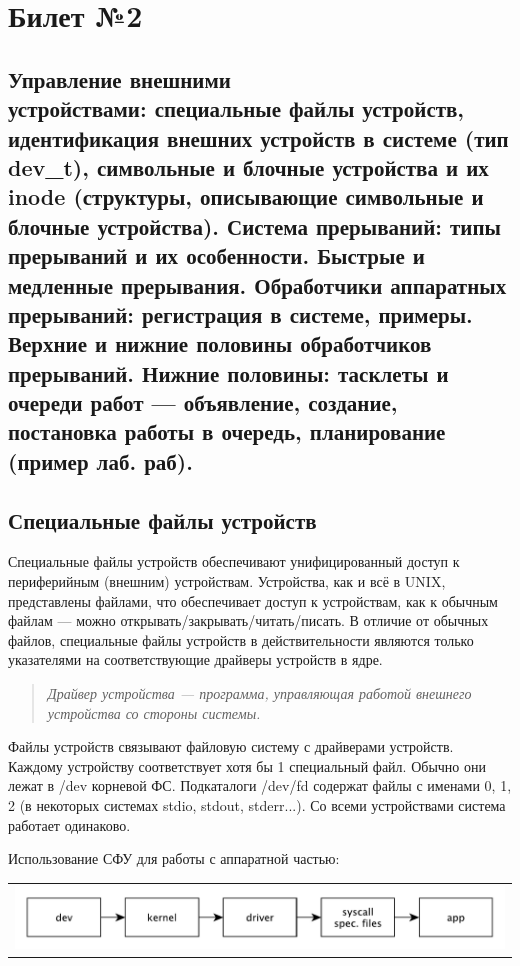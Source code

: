 \chapter{Билет №2}

\section*{Управление внешними \\ устройствами: специальные файлы устройств, идентификация внешних устройств в системе (тип dev\_t), символьные и блочные устройства и их inode (структуры, описывающие символьные и блочные устройства). Система прерываний: типы прерываний и их особенности. Быстрые и медленные прерывания. Обработчики аппаратных прерываний: регистрация в системе, примеры. Верхние и нижние половины обработчиков прерываний. Нижние половины: тасклеты и очереди работ — объявление, создание, постановка работы в очередь, планирование (пример лаб. раб).}

\section{Специальные файлы устройств}
Специальные файлы устройств обеспечивают унифицированный доступ к периферийным (внешним) устройствам. Устройства, как и всё в UNIX, представлены файлами, что обеспечивает доступ к устройствам, как к обычным файлам --- можно открывать/закрывать/читать/писать. В отличие от обычных файлов, специальные файлы устройств в действительности являются только указателями на соответствующие драйверы устройств в ядре.

\begin{quote}
	\textit{Драйвер устройства --- программа, управляющая работой внешнего устройства со стороны системы.}
\end{quote}

 Файлы устройств связывают файловую систему с драйверами устройств. Каждому устройству соответствует хотя бы 1 специальный файл. Обычно они лежат в /dev корневой ФС. Подкаталоги /dev/fd содержат файлы с именами 0, 1, 2 (в некоторых системах stdio, stdout, stderr...). Со всеми устройствами система работает одинаково.

Использование СФУ для работы с аппаратной частью:

\begin{table}[h!]
  \centering
  \begin{tabular}{p{1\linewidth}}
    \centering
    \includegraphics[width=1\linewidth]{./images/spec_files.pdf}
  \end{tabular}
\end{table}

